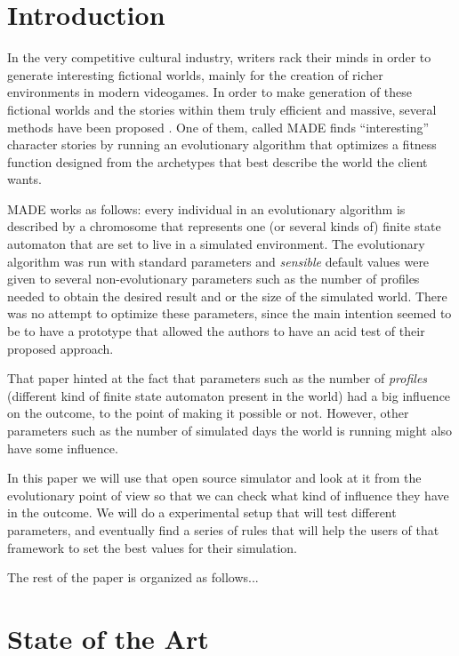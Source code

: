 \documentclass[runningheads,a4paper]{llncs}
\begin{document}
\section{Introduction}

In the very competitive cultural industry, writers rack their minds in
order to generate interesting fictional worlds, mainly for the
creation of richer environments in modern videogames. In order to make
generation of these fictional worlds and the stories within them truly efficient and massive,
several methods have been proposed \cite{garcia14my,nairat:evolution}. One of them, called MADE
\cite{garcia14my,nairat:evolution} finds ``interesting'' character stories by running
an evolutionary algorithm that optimizes a fitness function designed
from the archetypes that best describe the world the client wants.

MADE works as follows: every individual in an evolutionary algorithm
is described by a chromosome that represents one (or several kinds of)
finite state automaton that are set to live in a simulated
environment. The evolutionary algorithm was run with standard
parameters and {\em sensible} default values were given to several
non-evolutionary parameters such as the number of profiles needed to
obtain the desired result and or the size of the simulated
world. There was no attempt to optimize these parameters, since the
main intention seemed to be to have a prototype that allowed the
authors to have an acid test of their proposed approach.

That paper hinted at the fact that parameters such as the number of
{\em profiles} (different kind of finite state automaton present in
the world) had a big influence on the outcome, to the point of making
it possible or not. However, other parameters such as the number of
simulated days the world is running might also have some influence.

In this paper we will use that open source simulator and look at it
from the evolutionary point of view so that we can check what kind of
influence they have in the outcome. We will do a experimental setup
that will test different parameters, and eventually find a series of
rules that will help the users of that framework to set the best
values for their simulation. 

The rest of the paper is organized as follows...

\section{State of the Art}
\end{document}
